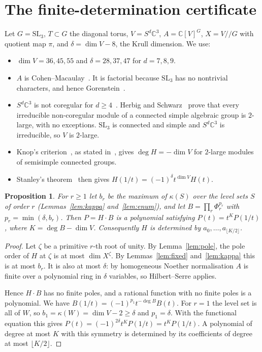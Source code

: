\documentclass[11pt]{amsart}
\newtheorem{proposition}[theorem]{Proposition}
\theoremstyle{definition}
\theoremstyle{remark}
\newcommand{\C}{\mathbb{C}}
\newcommand{\SL}{\mathrm{SL}}
\begin{document}
\section{The finite-determination certificate}\label{sec:cert}

Let $G=\SL_3$, $T\subset G$ the diagonal torus, $V=S^d\C^3$, $A=\C[V]^G$, $X=V/\!/G$ with quotient map $\pi$, and $\delta=\dim V-8$, the Krull dimension. We use:
\begin{itemize}
\item $\dim V=36,45,55$ and $\delta=28,37,47$ for $d=7,8,9$.
\item $A$ is Cohen--Macaulay~\cite{HR}. It is factorial because $\SL_3$ has no nontrivial characters, and hence Gorenstein~\cite{Murthy}.
\item $S^d\C^3$ is not coregular for $d\ge4$~\cite{Sch78}. Herbig and Schwarz~\cite[Thm.~3.7]{HS} prove that every irreducible non-coregular module of a connected simple algebraic group is $2$-large, with no exceptions. $\SL_3$ is connected and simple and $S^d\C^3$ is irreducible, so $V$ is $2$-large.
\item Knop's criterion~\cite{Knop}, as stated in~\cite[Thm.~3.3]{Mak16}, gives $\deg H=-\dim V$ for $2$-large modules of semisimple connected groups.
\item Stanley's theorem~\cite{Stanley} then gives $H(1/t)=(-1)^\delta t^{\dim V}H(t)$.
\end{itemize}

\begin{proposition}\label{prop:cert}
For $r\ge1$ let $b_r$ be the maximum of $\kappa(S)$ over the level sets $S$ of order $r$ (Lemmas~\ref{lem:kappa} and~\ref{lem:enum}), and let $B=\prod_r\Phi_r^{p_r}$ with $p_r=\min(\delta,b_r)$. Then $P=H\cdot B$ is a polynomial satisfying $P(t)=t^KP(1/t)$, where $K=\deg B-\dim V$. Consequently $H$ is determined by $a_0,\dots,a_{\lfloor K/2\rfloor}$.
\end{proposition}
\begin{proof}
Let $\zeta$ be a primitive $r$-th root of unity. By Lemma~\ref{lem:pole}, the pole order of $H$ at $\zeta$ is at most $\dim X^\zeta$. By Lemmas~\ref{lem:fixed} and~\ref{lem:kappa} this is at most $b_r$. It is also at most $\delta$: by homogeneous Noether normalisation $A$ is finite over a polynomial ring in $\delta$ variables, so Hilbert--Serre applies.

Hence $H\cdot B$ has no finite poles, and a rational function with no finite poles is a polynomial. We have $B(1/t)=(-1)^{p_1}t^{-\deg B}B(t)$. For $r=1$ the level set is all of $W$, so $b_1=\kappa(W)=\dim V-2\ge\delta$ and $p_1=\delta$. With the functional equation this gives $P(t)=(-1)^{2\delta}t^KP(1/t)=t^KP(1/t)$. A polynomial of degree at most $K$ with this symmetry is determined by its coefficients of degree at most $\lfloor K/2\rfloor$.
\end{proof}
\end{document}
